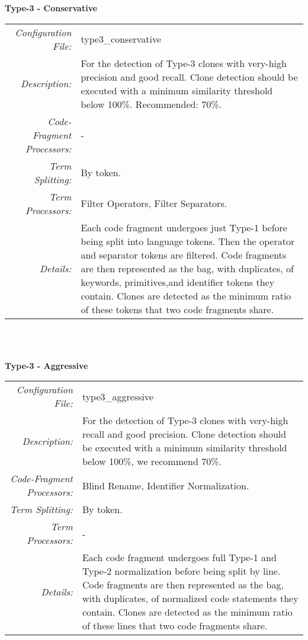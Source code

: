 \documentclass[]{article}
\begin{document}
		\noindent\begin{minipage}{\textwidth}
			\textbf{Type-3 - Conservative}\\
			\begin{tabular}{rp{12.5cm}}
				\bottomrule[2pt]
				\textit{Configuration File:} & type3\_conservative \\
				\textit{Description:}       & For the detection of Type-3 clones with very-high precision and good recall.  Clone detection should be executed with a minimum similarity threshold below 100\%.  Recommended: 70\%.\\
				\midrule
				\textit{Code-Fragment Processors:} & - \\
				\textit{Term Splitting:}  & By token.\\
				\textit{Term Processors:} & Filter Operators, Filter Separators.\\
				\midrule
				\textit{Details:}         & Each code fragment undergoes just Type-1 before being split into language tokens.  Then the operator and separator tokens are filtered.  Code fragments are then represented as the bag, with duplicates, of keywords, primitives,and identifier tokens they contain.  Clones are detected as the minimum ratio of these tokens that two code fragments share.\\
				\bottomrule[2pt]
			\end{tabular} \\\\
		\end{minipage}
		
		\noindent\begin{minipage}{\textwidth}
			\textbf{Type-3 - Aggressive}\\
			\begin{tabular}{rp{12.5cm}}
				\bottomrule[2pt]
				\textit{Configuration File:} & type3\_aggressive \\
				\textit{Description:}       & For the detection of Type-3 clones with very-high recall and good precision.  Clone detection should be executed with a minimum similarity threshold below 100\%, we recommend 70\%.\\
				\midrule
				\textit{Code-Fragment Processors:} & Blind Rename, Identifier Normalization. \\
				\textit{Term Splitting:}  & By token.\\
				\textit{Term Processors:} & - \\
				\midrule
				\textit{Details:}         & Each code fragment undergoes full Type-1 and Type-2 normalization before being split by line.  Code fragments are then represented as the bag, with duplicates, of normalized code statements they contain.  Clones are detected as the minimum ratio of these lines that two code fragments share.\\
				\bottomrule[2pt]
			\end{tabular} \\\\
		\end{minipage}
	
\end{document}
